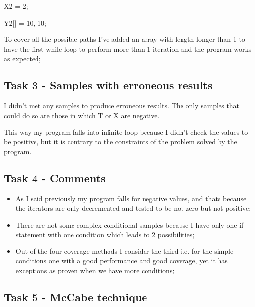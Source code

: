 X2 = 2; 

Y2[] = {10, 10};

\vspace{0.5cm}

To cover all the possible paths I've added an array with length longer than 1 to have the first while loop to perform more than 1 iteration and the program works as expected;

\vspace{1cm} 


\subsection{Task 3 - Samples with erroneous results}

I didn't met any samples to produce erroneous results. The only samples that could do so are those in which T or X are negative. 

This way my program falls into infinite loop because I didn't check the values to be positive, but it is contrary to the constraints of the problem solved by the program.

\subsection{Task 4 - Comments}

\begin{itemize}
	\item As I said previously my program falls for negative values, and thats because the iterators are only decremented and tested to be not zero but not positive;
	\item There are not some complex conditional samples because I have only one if statement with one condition which leads to 2 possibilities;
	\item Out of the four coverage methods I consider the third i.e. for the simple conditions one with a good performance and good coverage, yet it has exceptions as proven when we have more conditions;
\end{itemize}


\subsection{Task 5 - McCabe technique}


